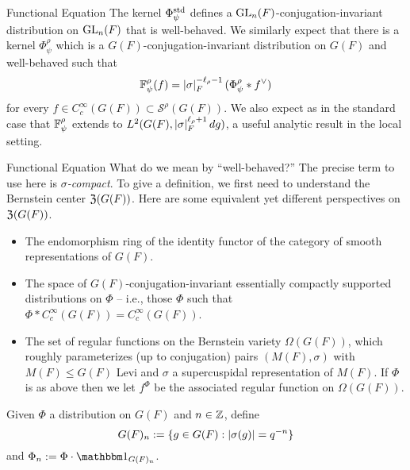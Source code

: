 \documentclass[aspectratio=1610]{beamer}
\renewcommand{\S}{\mathscr{S}}
\newcommand{\std}{\textup{std}}
\begin{document}
\begin{frame}{Functional Equation}
\pause The kernel $\Phi_{\psi}^{\std}$ defines a $\textup{GL}_n(F)$-conjugation-invariant distribution on $\textup{GL}_n(F)$ that is well-behaved. \pause We similarly expect that there is a kernel $\Phi_{\psi}^{\rho}$ which is a $G(F)$-conjugation-invariant distribution on $G(F)$ and well-behaved such that 
$$\mathbb{F}_{\psi}^{\rho}(f)=\left\lvert\sigma\right\rvert_F^{-\ell_{\rho}-1}(\Phi_{\psi}^{\rho}*f^{\vee})$$
for every $f\in C_c^{\infty}(G(F))\subset\S^{\rho}(G(F))$. \pause We also expect as in the standard case that $\mathbb{F}_{\psi}^{\rho}$ extends to $L^2(G(F),\left\lvert\sigma\right\rvert_F^{\ell_{\rho}+1}dg)$, a useful analytic result in the local setting.
\end{frame}

\begin{frame}{Functional Equation}
\pause What do we mean by ``well-behaved?'' \pause The precise term to use here is \emph{$\sigma$-compact}. \pause To give a definition, we first need to understand the Bernstein center $\mathfrak{Z}(G(F))$. Here are some equivalent yet different perspectives on $\mathfrak{Z}(G(F))$.
\begin{itemize}
\pause\item The endomorphism ring of the identity functor of the category of smooth representations of $G(F)$.

\pause\item The space of $G(F)$-conjugation-invariant essentially compactly supported distributions on $\Phi$ -- i.e., those $\Phi$ such that $\Phi*C_c^{\infty}(G(F))=C_c^{\infty}(G(F))$.

\pause\item The set of regular functions on the Bernstein variety $\Omega(G(F))$, which roughly parameterizes (up to conjugation) pairs $(M(F),\sigma)$ with $M(F)\leq G(F)$ Levi and $\sigma$ a supercuspidal representation of $M(F)$. \pause If $\Phi$ is as above then we let $f^{\Phi}$ be the associated regular function on $\Omega(G(F))$.
\end{itemize}

\pause Given $\Phi$ a distribution on $G(F)$ and $n\in\mathbb{Z}$, define 
$$G(F)_n:=\{g\in G(F) : \left\lvert\sigma(g)\right\rvert=q^{-n}\}$$
and $\Phi_n:=\Phi\cdot\ind_{G(F)_n}$. 
\end{frame}
\end{document}
